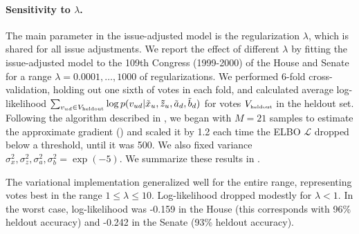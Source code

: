\label{section:performance}
\paragraph{Sensitivity to $\lambda$.}
The main parameter in the issue-adjusted model is the regularization
$\lambda$, which is shared for all issue adjustments. We report the
effect of different $\lambda$ by fitting the issue-adjusted model to
the 109th Congress (1999-2000) of the House and Senate for a range
$\lambda=0.0001, \ldots, 1000$ of regularizations.  We performed
$6$-fold cross-validation, holding out one sixth of votes in each
fold, and calculated average log-likelihood $\sum_{v_{ud} \in
  V_{\mbox{\tiny heldout}}} \log p(v_{ud} | \tilde x_u, \bm \tilde
z_u, \tilde a_d, \tilde b_d)$ for votes $V_{\mbox{\tiny heldout}}$ in
the heldout set. Following the algorithm described in
, we began with $M=21$ samples to estimate the
approximate gradient () and scaled it by
1.2 each time the ELBO $\mathcal{L}$ dropped below a threshold, until
it was 500. We also fixed variance $\sigma_x^2, \sigma_z^2,
\sigma_a^2, \sigma_b^2=\exp({-}5)$.  We summarize these results in
.

The variational implementation generalized well for the entire range,
representing votes best in the range $1 \le \lambda \le 10$.
Log-likelihood dropped modestly for $\lambda < 1$.  In the worst case,
log-likelihood was -0.159 in the House (this corresponds with 96\%
heldout accuracy) and -0.242 in the Senate (93\% heldout accuracy).


